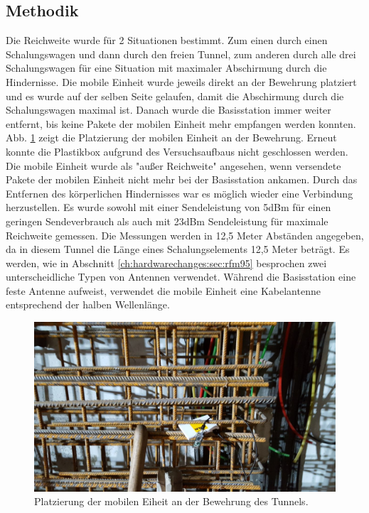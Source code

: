 \subsection{Methodik} 
Die Reichweite wurde für 2 Situationen bestimmt.
Zum einen durch einen Schalungswagen und dann durch den freien Tunnel, zum anderen durch alle drei Schalungswagen für eine Situation mit maximaler Abschirmung durch die Hindernisse.
Die mobile Einheit wurde jeweils direkt an der Bewehrung platziert und es wurde auf der selben Seite gelaufen, damit die Abschirmung durch die Schalungswagen maximal ist.
Danach wurde die Basisstation immer weiter entfernt, bis keine Pakete der mobilen Einheit mehr empfangen werden konnten.
Abb. \ref{fig:lorabasis} zeigt die Platzierung der mobilen Einheit an der Bewehrung.
Erneut konnte die Plastikbox aufgrund des Versuchsaufbaus nicht geschlossen werden.
Die mobile Einheit wurde als "außer Reichweite" angesehen, wenn versendete Pakete der mobilen Einheit nicht mehr bei der Basisstation ankamen.
Durch das Entfernen des körperlichen Hindernisses war es möglich wieder eine Verbindung herzustellen.
Es wurde sowohl mit einer Sendeleistung von 5dBm für einen geringen Sendeverbrauch als auch mit 23dBm Sendeleistung für maximale Reichweite gemessen.
Die Messungen werden in 12,5 Meter Abständen angegeben, da in diesem Tunnel die Länge eines Schalungselements 12,5 Meter beträgt.
Es werden, wie in Abschnitt \ref{ch:hardwarechanges:sec:rfm95} besprochen zwei unterscheidliche Typen von Antennen verwendet. 
Während die Basisstation eine feste Antenne aufweist, verwendet die mobile Einheit eine Kabelantenne entsprechend der halben Wellenlänge. 

\begin{figure}[h]
  \centering
	\includegraphics[width=\textwidth]{images/lorabasis.jpg}
  \caption{Platzierung der mobilen Eiheit an der Bewehrung des Tunnels.}
  \label{fig:lorabasis}
\end{figure}


